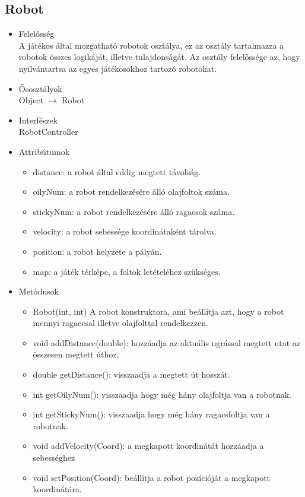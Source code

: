 \subsection{Robot}
\begin{itemize}
	\item Felelősség\\
	A játékos által mozgatható robotok osztálya, ez az osztály tartalmazza a robotok összes logikáját, illetve tulajdonságát. Az osztály felelőssége az, hogy nyilvántartsa az egyes játékosokhoz tartozó robotokat.
	\item Ősosztályok\\
	Object $\rightarrow$ Robot
	\item Interfészek\\
	RobotController
	\item Attribútumok\\
	\begin{itemize}
		\item distance: a robot által eddig megtett távolság.
		\item oilyNum: a robot rendelkezésére álló olajfoltok száma.
		\item stickyNum: a robot rendelkezésére álló ragacsok száma.
		\item velocity: a robot sebessége koordinátaként tárolva.
		\item position: a robot helyzete a pályán.
		\item map: a játék térképe, a foltok letételéhez szükséges.
	\end{itemize}
	\item Metódusok\\
	\begin{itemize}
		\item Robot(int, int) A robot konstruktora, ami beállítja azt, hogy a robot mennyi ragaccsal illetve olajfolttal rendelkezzen.
		\item void addDistance(double): hozzáadja az aktuális ugrással megtett utat az összesen megtett úthoz.
		\item double getDistance(): visszaadja a megtett út hosszát.
		\item int getOilyNum(): visszaadja hogy még hány olajfoltja van a robotnak.
		\item int getStickyNum(): visszaadja hogy még hány ragacsfoltja van a robotnak.
		\item void addVelocity(Coord): a megkapott koordinátát hozzáadja a sebességhez
		\item void setPosition(Coord): beállítja a robot pozícióját a megkapott koordinátára.

\end{itemize}
\end{itemize}
